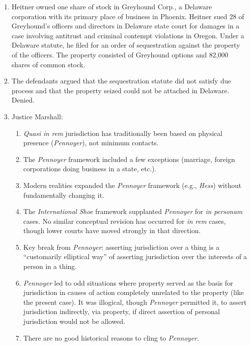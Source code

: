 \begin{enumerate}
    \item Heitner owned one share of stock in Greyhound Corp., a
    Delaware corporation with its primary place of business in Phoenix.
    Heitner sued 28 of Greyhound's officers and directors in Delaware state 
    court for damages in a case involving antitrust and criminal contempt 
    violations in Oregon. Under a Delaware statute, he filed for an order of 
    sequestration against
    the property of the officers. The property consisted of Greyhound
    options and 82,000 shares of common stock.
    \item The defendants argued that the sequestration statute did not satisfy 
    due process and that the property seized could not be attached in
    Delaware. Denied.
    \item Justice Marshall:
    \begin{enumerate}
        \item \emph{Quasi in rem} jurisdiction has traditionally been based on 
        physical presence (\emph{Pennoyer}), not minimum contacts.
        \item The \emph{Pennoyer} framework included a few exceptions 
        (marriage, foreign corporations doing business in a state, etc.).
        \item Modern realities expanded the \emph{Pennoyer} framework (e.g., 
        \emph{Hess}) without fundamentally changing it.
        \item The \emph{International Shoe} framework supplanted 
        \emph{Pennoyer} for \emph{in personam} cases. No similar conceptual 
        revision has occurred for \emph{in rem} cases, though lower courts 
        have moved strongly in that direction.
        \item Key break from \emph{Pennoyer}: asserting jurisdiction over a 
        thing is a ``customarily elliptical way'' of asserting jurisdiction 
        over the interests of a person in a thing.
        \item \emph{Pennoyer} led to odd situations where property served as 
        the basis for jurisdiction in causes of action completely unrelated to 
        the property (like the present case). It was illogical, though 
        \emph{Pennoyer} permitted it, to assert jurisdiction indirectly, via 
        property, if direct assertion of personal jurisdiction would not be 
        allowed.
        \item There are no good historical reasons to cling to 
        \emph{Pennoyer}.

\end{enumerate}
\end{enumerate}
